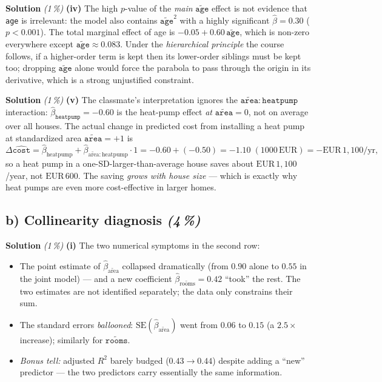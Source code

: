 \documentclass[11pt,a4paper]{article}
\newcommand{\subpoints}[1]{\textit{(#1\,\%)}}
\newcommand{\sol}{\noindent\textbf{Solution}}
\begin{document}
\medskip
\sol{} \subpoints{1} \textbf{(iv)} The high $p$-value of the \emph{main} $\widetilde{\texttt{age}}$
effect is not evidence that \texttt{age} is irrelevant: the model also contains
$\widetilde{\texttt{age}}^2$ with a highly significant $\hat\beta = 0.30$ ($p<0.001$). The total
marginal effect of age is $-0.05 + 0.60\,\widetilde{\texttt{age}}$, which is non-zero everywhere
except $\widetilde{\texttt{age}}\approx 0.083$. Under the \emph{hierarchical principle} the
course follows, if a higher-order term is kept then its lower-order siblings must be kept too;
dropping $\widetilde{\texttt{age}}$ alone would force the parabola to pass through the origin in
its derivative, which is a strong unjustified constraint.

\medskip
\sol{} \subpoints{1} \textbf{(v)} The classmate's interpretation ignores the
$\widetilde{\texttt{area}}{:}\texttt{heatpump}$ interaction: $\hat\beta_{\texttt{heatpump}}=-0.60$
is the heat-pump effect \emph{at} $\widetilde{\texttt{area}}=0$, not on average over all houses.
The actual change in predicted cost from installing a heat pump at standardized area
$\widetilde{\texttt{area}} = +1$ is
$$\Delta\widehat{\texttt{cost}} = \hat\beta_{\text{heatpump}} + \hat\beta_{\widetilde{\text{area}}:\text{heatpump}}\cdot 1
   = -0.60 + (-0.50) = -1.10\;(1000\,\text{EUR}) = \boxed{-\mathrm{EUR}\,1{,}100/\text{yr}},$$
so a heat pump in a one-SD-larger-than-average house saves about $\mathrm{EUR}\,1{,}100$/year, not $\mathrm{EUR}\,600$. The
saving \emph{grows with house size} --- which is exactly why heat pumps are even more
cost-effective in larger homes.

\subsection*{b) Collinearity diagnosis \subpoints{4}}

\sol{} \subpoints{1} \textbf{(i)} The two numerical symptoms in the second row:
\begin{itemize}
  \item The point estimate of $\hat\beta_{\widetilde{\text{area}}}$ collapsed dramatically (from
        $0.90$ alone to $0.55$ in the joint model) --- and a new coefficient
        $\hat\beta_{\widetilde{\text{rooms}}} = 0.42$ ``took'' the rest. The two estimates are not
        identified separately; the data only constrains their sum.
  \item The standard errors \emph{ballooned}: $\mathrm{SE}(\hat\beta_{\widetilde{\text{area}}})$
        went from $0.06$ to $0.15$ (a $2.5\times$ increase); similarly for $\widetilde{\texttt{rooms}}$.
  \item \emph{Bonus tell:} adjusted $R^2$ barely budged ($0.43\to 0.44$) despite adding a
        ``new'' predictor --- the two predictors carry essentially the same information.
\end{itemize}
\end{document}
